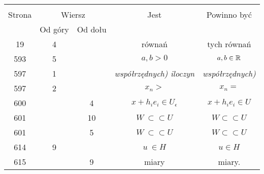 \documentclass[a4paper,11pt]{article}
\begin{document}
\begin{center}

  \begin{tabular}{|c|c|c|c|c|}
    \hline
    & \multicolumn{2}{c|}{} & & \\
    Strona & \multicolumn{2}{c|}{Wiersz} & Jest
                              & Powinno być \\ \cline{2-3}
    & Od góry & Od dołu & & \\
    \hline
    19  &  4 & & równań & tych równań \\
    593 &  5 & & $a, b > 0$ & $a, b \in \mathbb{R}$ \\
    597 &  1 & & \textit{współrzędnych) iloczyn}
           & \textit{współrzędnych)} \\
    597 &  2 & & $x_{ n } >$ & $x_{ n } =$ \\
    600 & & 4 & $x + h_{ i } e_{ i } \in U_{ \epsilon }$
           & $x + h_{ i } e_{ i } \in U$ \\
    601 & & 10 & $W \: \subset \subset U$ & $W \subset \subset U$ \\
    601 & &  5 & $W \: \subset \subset U$ & $W \subset \subset U$ \\
    614 &  9 & & $u \: \in H$ & $u \in H$\\
    615 & &  9 & miary & miary. \\
    \hline
  \end{tabular}

\end{center}

\vspace{\spaceTwo}










\end{document}
